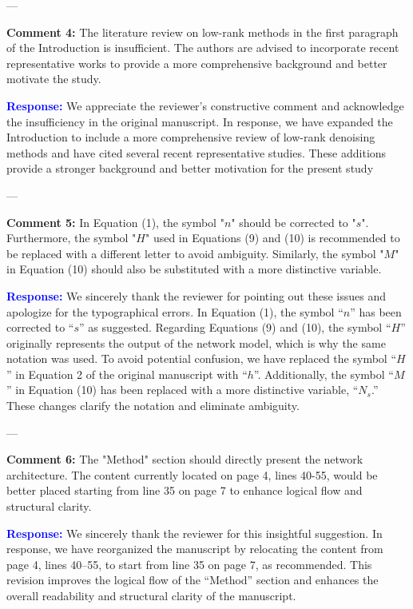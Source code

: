 \documentclass[12pt]{article}
\begin{document}
---

\textbf{Comment 4:}  
The literature review on low-rank methods in the first paragraph of the Introduction is insufficient. The authors are advised to incorporate recent representative works to provide a more comprehensive background and better motivate the study.

\textcolor{blue}{\textbf{Response:}} 
We appreciate the reviewer’s constructive comment and acknowledge the insufficiency in the original manuscript. In response, we have expanded the Introduction to include a more comprehensive review of low-rank denoising methods and have cited several recent representative studies. These additions provide a stronger background and better motivation for the present study

---

\textbf{Comment 5:}  
In Equation (1), the symbol "$n$" should be corrected to "$s$". Furthermore, the symbol "$H$" used in Equations (9) and (10) is recommended to be replaced with a different letter to avoid ambiguity. Similarly, the symbol "$M$" in Equation (10) should also be substituted with a more distinctive variable.

\textcolor{blue}{\textbf{Response:}} 
We sincerely thank the reviewer for pointing out these issues and apologize for the typographical errors. In Equation (1), the symbol “$n$” has been corrected to “$s$” as suggested. Regarding Equations (9) and (10), the symbol “$H$” originally represents the output of the network model, which is why the same notation was used. To avoid potential confusion, we have replaced the symbol “$H$” in Equation 2 of the original manuscript with “$h$”. Additionally, the symbol “$M$” in Equation (10) has been replaced with a more distinctive variable, “$N_s$.” These changes clarify the notation and eliminate ambiguity.

---

\textbf{Comment 6:}  
The "Method" section should directly present the network architecture. The content currently located on page 4, lines 40-55, would be better placed starting from line 35 on page 7 to enhance logical flow and structural clarity.

\textcolor{blue}{\textbf{Response:}} 
We sincerely thank the reviewer for this insightful suggestion. In response, we have reorganized the manuscript by relocating the content from page 4, lines 40–55, to start from line 35 on page 7, as recommended. This revision improves the logical flow of the “Method” section and enhances the overall readability and structural clarity of the manuscript.
\end{document}
